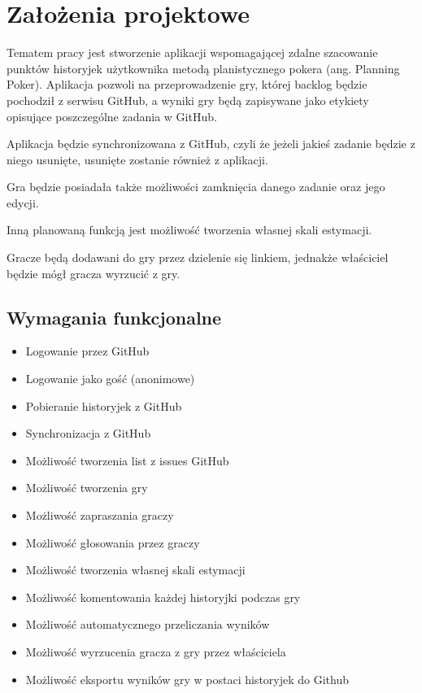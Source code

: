 ﻿\chapter{Założenia projektowe}

Tematem pracy jest stworzenie aplikacji wspomagającej zdalne szacowanie punktów historyjek użytkownika metodą planistycznego pokera (ang. Planning Poker).
Aplikacja pozwoli na przeprowadzenie gry, której backlog będzie pochodził z serwisu GitHub,
a wyniki gry będą zapisywane jako etykiety opisujące poszczególne zadania w GitHub.

Aplikacja będzie synchronizowana z GitHub,
czyli że jeżeli jakieś zadanie będzie z niego usunięte, usunięte zostanie również
z aplikacji.

Gra będzie posiadała także możliwości zamknięcia danego zadanie oraz jego edycji.

Inną planowaną funkcją jest możliwość tworzenia własnej skali estymacji.

Gracze będą dodawani do gry przez dzielenie się linkiem,
jednakże właściciel będzie mógł gracza wyrzucić z gry.

\section{Wymagania funkcjonalne}

\begin{itemize}
    \item Logowanie przez GitHub
    \item Logowanie jako gość (anonimowe)
    \item Pobieranie historyjek z GitHub
    \item Synchronizacja z GitHub
    \item Możliwość tworzenia list z issues GitHub
    \item Możliwość tworzenia gry
    \item Możliwość zapraszania graczy
    \item Możliwość głosowania przez graczy
    \item Możliwość tworzenia własnej skali estymacji
    \item Możliwość komentowania każdej historyjki podczas gry
    \item Możliwość automatycznego przeliczania wyników
    \item Możliwość wyrzucenia gracza z gry przez właściciela
    \item Możliwość eksportu wyników gry w postaci historyjek do Github
\end{itemize}

